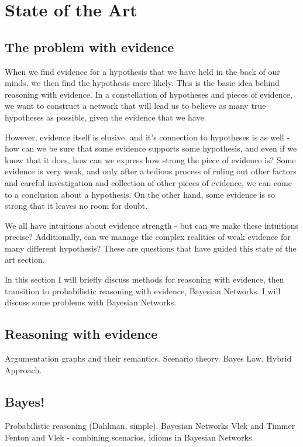 
\chapter[State of the Art]{State of the Art}

\section{The problem with evidence}

When we find evidence for a hypothesis that we have held in the back of our minds, we then find the hypothesis more likely. 
This is the basic idea behind reasoning with evidence. In a constellation of hypotheses and pieces of evidence, we want
to construct a network that will lead us to believe as many true hypotheses as possible, given the evidence that we have.

However, evidence itself is elusive, and it's connection to hypotheses is as well - how can we be sure that some evidence supports
some hypothesis, and even if we know that it does, how can we express how strong the piece of evidence is? Some evidence
is very weak, and only after a tedious process of ruling out other factors and careful investigation and collection of other pieces
of evidence, we can come to a conclusion about a hypothesis. On the other hand, some evidence is so strong that it leaves no room for doubt.

We all have intuitions about evidence strength - but can we make these intuitions precise? Additionally, can we manage the complex
realities of weak evidence for many different hypothesis? These are questions that have guided this state of the art section.

In this section I will briefly discuss methods for reasoning with evidence, then transition to probabilistic reasoning with evidence,
Bayesian Networks. I will discuss some problems with Bayesian Networks.

\section{Reasoning with evidence}
Argumentation graphs and their semantics.
Scenario theory.
Bayes Law.
Hybrid Approach.

\section{Bayes!}
Probabilistic reasoning (Dahlman, simple).
Bayesian Networks
Vlek and Timmer
Fenton and Vlek - combining scenarios, idioms in Bayesian Networks.

